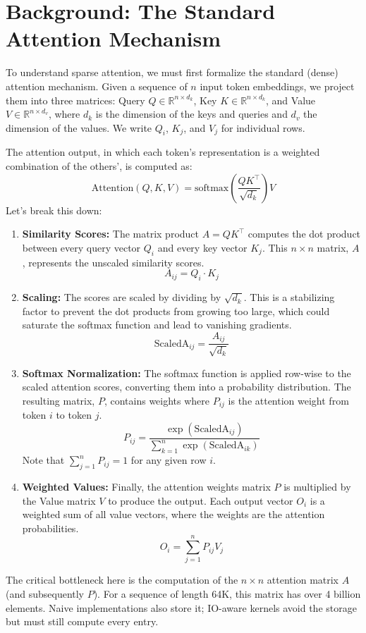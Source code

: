 \documentclass{article}
\begin{document}
\section{Background: The Standard Attention Mechanism}

To understand sparse attention, we must first formalize the standard (dense) attention mechanism. Given a sequence of \(n\) input token embeddings, we project them into three matrices: Query \(Q \in \mathbb{R}^{n \times d_k}\), Key \(K \in \mathbb{R}^{n \times d_k}\), and Value \(V \in \mathbb{R}^{n \times d_v}\), where \(d_k\) is the dimension of the keys and queries and \(d_v\) the dimension of the values. We write \(Q_i\), \(K_j\), and \(V_j\) for individual rows.

The attention output, in which each token's representation is a weighted combination of the others', is computed as:
\[
\text{Attention}(Q, K, V) = \text{softmax}\left(\frac{QK^\top}{\sqrt{d_k}}\right)V
\]
Let's break this down:
\begin{enumerate}
    \item \textbf{Similarity Scores:} The matrix product \(A = QK^\top\) computes the dot product between every query vector \(Q_i\) and every key vector \(K_j\). This \(n \times n\) matrix, \(A\), represents the unscaled similarity scores.
    \[
    A_{ij} = Q_i \cdot K_j
    \]

    \item \textbf{Scaling:} The scores are scaled by dividing by \(\sqrt{d_k}\). This is a stabilizing factor to prevent the dot products from growing too large, which could saturate the softmax function and lead to vanishing gradients.
    \[
    \text{ScaledA}_{ij} = \frac{A_{ij}}{\sqrt{d_k}}
    \]

    \item \textbf{Softmax Normalization:} The softmax function is applied row-wise to the scaled attention scores, converting them into a probability distribution. The resulting matrix, \(P\), contains weights where \(P_{ij}\) is the attention weight from token \(i\) to token \(j\).
    \[
    P_{ij} = \frac{\exp(\text{ScaledA}_{ij})}{\sum_{k=1}^{n} \exp(\text{ScaledA}_{ik})}
    \]
    Note that \(\sum_{j=1}^{n} P_{ij} = 1\) for any given row \(i\).

    \item \textbf{Weighted Values:} Finally, the attention weights matrix \(P\) is multiplied by the Value matrix \(V\) to produce the output. Each output vector \(O_i\) is a weighted sum of all value vectors, where the weights are the attention probabilities.
    \[
    O_i = \sum_{j=1}^{n} P_{ij} V_j
    \]
\end{enumerate}
The critical bottleneck here is the computation of the \(n \times n\) attention matrix \(A\) (and subsequently \(P\)). For a sequence of length 64K, this matrix has over 4 billion elements. Naive implementations also store it; IO-aware kernels avoid the storage but must still compute every entry.
\end{document}
